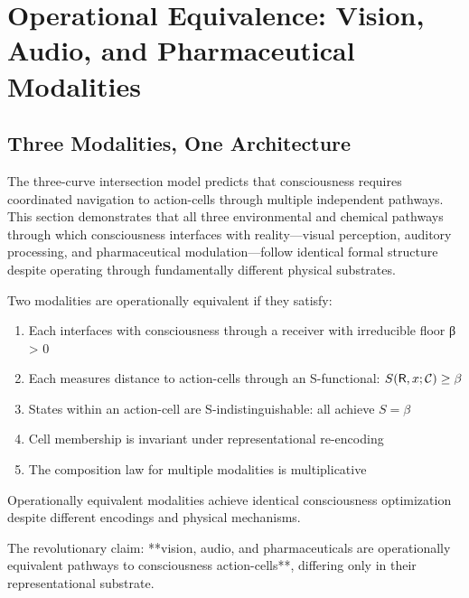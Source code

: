 \section{Operational Equivalence: Vision, Audio, and Pharmaceutical Modalities}
\label{sec:operational-equivalence}

\subsection{Three Modalities, One Architecture}

The three-curve intersection model predicts that consciousness requires coordinated navigation to action-cells through multiple independent pathways. This section demonstrates that all three environmental and chemical pathways through which consciousness interfaces with reality—visual perception, auditory processing, and pharmaceutical modulation—follow identical formal structure despite operating through fundamentally different physical substrates.

\begin{definition}
\label{def:operational-equiv}
Two modalities are operationally equivalent if they satisfy:
\begin{enumerate}[label=(\roman*),leftmargin=*]
\item Each interfaces with consciousness through a receiver with irreducible floor β > 0
\item Each measures distance to action-cells through an S-functional: $S(\mathsf{R}, x; \mathcal{C}) \geq \beta$
\item States within an action-cell are S-indistinguishable: all achieve $S = \beta$
\item Cell membership is invariant under representational re-encoding
\item The composition law for multiple modalities is multiplicative
\end{enumerate}

Operationally equivalent modalities achieve identical consciousness optimization despite different encodings and physical mechanisms.
\end{definition}

The revolutionary claim: **vision, audio, and pharmaceuticals are operationally equivalent pathways to consciousness action-cells**, differing only in their representational substrate.

